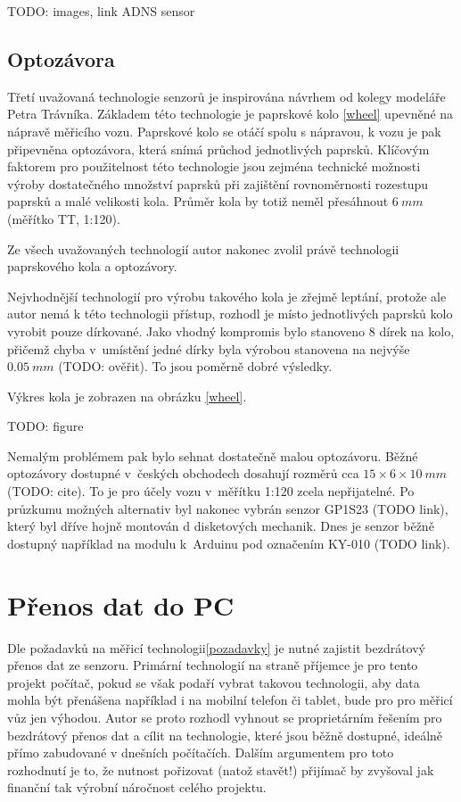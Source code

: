 TODO: images, link ADNS sensor

\subsection{Optozávora}

Třetí uvažovaná technologie senzorů je inspirována návrhem od kolegy modeláře
Petra Trávníka. Základem této technologie je paprskové kolo \ref{wheel} upevněné
na nápravě měřicího vozu. Paprskové kolo se otáčí spolu s nápravou, k vozu je
pak připevněna optozávora, která snímá průchod jednotlivých paprsků. Klíčovým
faktorem pro použitelnost této technologie jsou zejména technické možnosti
výroby dostatečného množství paprsků při zajištění rovnoměrnosti rozestupu
paprsků a malé velikosti kola. Průměr kola by totiž neměl přesáhnout $6\ mm$
(měřítko TT, 1:120).

Ze všech uvažovaných technologií autor nakonec zvolil právě technologii
paprskového kola a optozávory.

Nejvhodnější technologií pro výrobu takového kola je zřejmě leptání, protože
ale autor nemá k této technologii přístup, rozhodl je místo jednotlivých
paprsků kolo vyrobit pouze dírkované. Jako vhodný kompromis bylo stanoveno
8 dírek na kolo, přičemž chyba v~umístění jedné dírky byla výrobou stanovena na
nejvýše $0.05\ mm$ (TODO: ověřit). To jsou poměrně dobré výsledky.

Výkres kola je zobrazen na obrázku \ref{wheel}.

TODO: figure

Nemalým problémem pak bylo sehnat dostatečně malou optozávoru. Běžné optozávory
dostupné v~českých obchodech dosahují rozměrů cca $15\times6\times10\ mm$
(TODO: cite). To je pro účely vozu v~měřítku 1:120 zcela nepřijatelné. Po
průzkumu možných alternativ byl nakonec vybrán senzor GP1S23 (TODO link), který
byl dříve hojně montován d disketových mechanik. Dnes je senzor běžně dostupný
například na modulu k~Arduinu pod označením KY-010 (TODO link).

\section{Přenos dat do PC}

Dle požadavků na měřicí technologii\ref{pozadavky} je nutné zajistit bezdrátový
přenos dat ze senzoru. Primární technologií na straně příjemce je pro tento
projekt počítač, pokud se však podaří vybrat takovou technologii, aby data
mohla být přenášena například i na mobilní telefon či tablet, bude pro pro
měřicí vůz jen výhodou. Autor se proto rozhodl vyhnout se proprietárním řešením
pro bezdrátový přenos dat a cílit na technologie, které jsou běžně dostupné,
ideálně přímo zabudované v dnešních počítačích. Dalším argumentem pro toto
rozhodnutí je to, že nutnost pořizovat (natož stavět!) přijímač by zvyšoval
jak finanční tak výrobní náročnost celého projektu.

